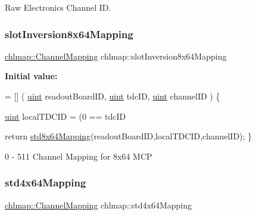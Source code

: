 Raw Electronics Channel ID. 

\mbox{\label{namespacechlmap_addbd4a4856137809b06e1bffd39e2897}} 
\subsubsection{\texorpdfstring{slot\+Inversion8x64\+Mapping}{slotInversion8x64Mapping}}
{\footnotesize\ttfamily \hyperlink{namespacechlmap_aeed247fbd4770834005177ddb2712668}{chlmap\+::\+Channel\+Mapping} chlmap\+::slot\+Inversion8x64\+Mapping}

{\bfseries Initial value\+:}
\begin{DoxyCode}
= [] (
    \hyperlink{_channel_mappings_8cpp_a69aa29b598b851b0640aa225a9e5d61d}{uint} readoutBoardID,
    \hyperlink{_channel_mappings_8cpp_a69aa29b598b851b0640aa225a9e5d61d}{uint} tdcID,
    \hyperlink{_channel_mappings_8cpp_a69aa29b598b851b0640aa225a9e5d61d}{uint} channelID
) \{
    
    \hyperlink{_channel_mappings_8cpp_a69aa29b598b851b0640aa225a9e5d61d}{uint} localTDCID = (0 == tdcID%

    
    \textcolor{keywordflow}{return} \hyperlink{namespacechlmap_a11d7121de30a32ead9032c59221b7442}{std8x64Mapping}(readoutBoardID,localTDCID,channelID);
\}
\end{DoxyCode}


0 -\/ 511 Channel Mapping for 8x64 M\+CP 

\mbox{\label{namespacechlmap_a8acaf58562324b3f691a218f08c7afe4}} 
\subsubsection{\texorpdfstring{std4x64\+Mapping}{std4x64Mapping}}
{\footnotesize\ttfamily \hyperlink{namespacechlmap_aeed247fbd4770834005177ddb2712668}{chlmap\+::\+Channel\+Mapping} chlmap\+::std4x64\+Mapping}

